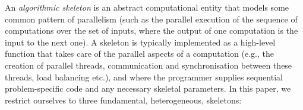 \documentclass[smallextended]{svjour3}
\begin{document}
\noindent
An \emph{algorithmic skeleton} is an abstract computational entity
that models some common pattern of parallelism (such as the 
parallel execution of the sequence of computations over the set of inputs,
where the output of one computation is the input to the next one). A skeleton is
typically implemented as a high-level function that takes care of the
parallel aspects of a computation (e.g., the creation of parallel threads,
communication and synchronisation between these threads, load
balancing etc.), and where the programmer supplies sequential problem-specific code and any necessary
skeletal parameters.
%
In this paper, we restrict ourselves to three fundamental, heterogeneous, skeletons: %
\end{document}
